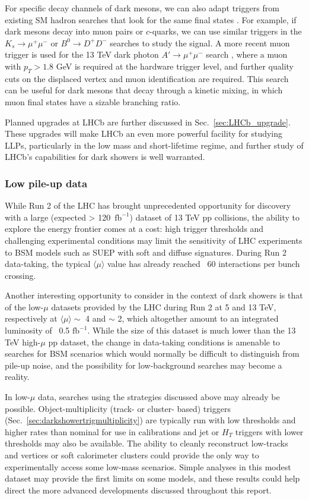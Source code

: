 For specific decay channels of dark mesons, we can also adapt triggers from  existing SM hadron searches that look for the same  final states \cite{Pierce:2017taw}. For example, if dark mesons decay into muon pairs or $c$-quarks, we can use similar triggers in the $K_s\to\mu^+\mu^-$ \cite{Aaij:2012rt} or $B^0\to D^+D^-$ \cite{Aaij:2016yip} searches to study the signal. A more recent muon trigger is used for the 13 TeV dark photon $A'\to\mu^+\mu^-$ search \cite{Aaij:2017rft}, where a muon with $p_T>1.8$ GeV is required at the hardware trigger level, and further quality cuts on the displaced vertex and muon identification are required. This search can be useful for dark mesons that decay through a kinetic mixing, in which muon final states have a sizable branching ratio.

Planned upgrades at LHCb are further discussed in Sec.~\ref{sec:LHCb_upgrade}.   These upgrades will make LHCb an even more powerful facility for studying LLPs, particularly in the low mass and short-lifetime regime, and further study of LHCb's capabilities for dark showers is well warranted.  

\subsubsection{Low pile-up data}

While Run 2 of the LHC has brought unprecedented opportunity for discovery with a large (expected > \mbox{120 $\text{fb}^{-1}$}) dataset of 13 TeV pp collisions, the ability to explore the energy frontier comes at a cost: high trigger thresholds and challenging experimental conditions may limit the sensitivity of LHC experiments to BSM models such as SUEP with soft and diffuse signatures. During Run 2 data-taking, the typical $\langle \mu\rangle$ value has already reached ~60 interactions per bunch crossing.

Another interesting opportunity to consider in the context of dark showers is that of the low-$\mu$ datasets provided by the LHC during Run 2 at 5 and 13 TeV, respectively at $\langle \mu\rangle\sim$ 4 and $\sim$ 2, which altogether amount to an integrated luminosity of ~0.5 $\text{fb}^{-1}$. While the size of this dataset is much lower than the 13 TeV high-$\mu$ pp dataset, the change in data-taking conditions is amenable to searches for BSM scenarios which would normally be difficult to distinguish from pile-up noise, and the possibility for low-background searches may become a reality.

In low-$\mu$ data, searches using the strategies discussed above may already be possible. Object-multiplicity (track- or cluster- based) triggers (Sec.~\ref{sec:darkshowertrigmultiplicity}) are typically run with low thresholds and higher rates than nominal for use in calibrations and jet or $H_T$ triggers with lower thresholds may also be available. The ability to cleanly reconstruct low-\pt tracks and vertices or soft calorimeter clusters could provide the only way to experimentally access some low-mass scenarios. Simple analyses in this modest dataset may provide the first limits on some models, and these results could help direct the more advanced developments discussed throughout this report.

